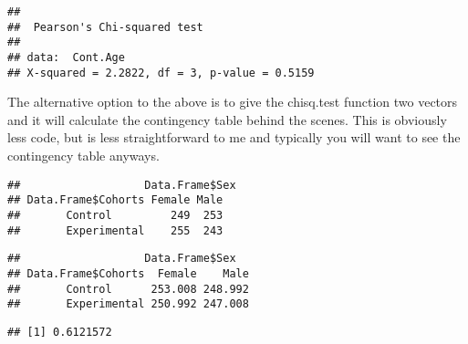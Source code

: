 \documentclass[
]{book}
\newenvironment{Shaded}{\begin{snugshade}}{\end{snugshade}}
\newcommand{\AttributeTok}[1]{\textcolor[rgb]{0.77,0.63,0.00}{#1}}
\newcommand{\FunctionTok}[1]{\textcolor[rgb]{0.00,0.00,0.00}{#1}}
\newcommand{\NormalTok}[1]{#1}
\newcommand{\OtherTok}[1]{\textcolor[rgb]{0.56,0.35,0.01}{#1}}
\newcommand{\SpecialCharTok}[1]{\textcolor[rgb]{0.00,0.00,0.00}{#1}}
\theoremstyle{definition}
\theoremstyle{definition}
\theoremstyle{definition}
\theoremstyle{definition}
\theoremstyle{remark}
\begin{document}
\begin{verbatim}
## 
##  Pearson's Chi-squared test
## 
## data:  Cont.Age
## X-squared = 2.2822, df = 3, p-value = 0.5159
\end{verbatim}

The alternative option to the above is to give the chisq.test function two vectors and it will calculate the contingency table behind the scenes. This is obviously less code, but is less straightforward to me and typically you will want to see the contingency table anyways.

\begin{Shaded}
\end{Shaded}

\begin{verbatim}
##                   Data.Frame$Sex
## Data.Frame$Cohorts Female Male
##       Control         249  253
##       Experimental    255  243
\end{verbatim}

\begin{Shaded}
\end{Shaded}

\begin{verbatim}
##                   Data.Frame$Sex
## Data.Frame$Cohorts  Female    Male
##       Control      253.008 248.992
##       Experimental 250.992 247.008
\end{verbatim}

\begin{Shaded}
\end{Shaded}

\begin{verbatim}
## [1] 0.6121572
\end{verbatim}

\begin{Shaded}
\end{Shaded}
\end{document}
